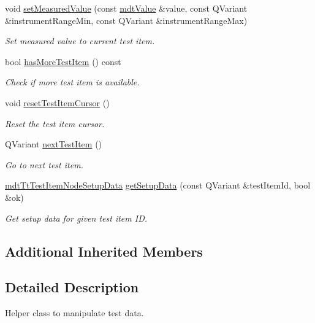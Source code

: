 \begin{DoxyCompactItemize}
void \hyperlink{classmdt_tt_test_a2e33bf83a20e02ed22aa8edd2a1d3f02}{set\-Measured\-Value} (const \hyperlink{classmdt_value}{mdt\-Value} \&value, const Q\-Variant \&instrument\-Range\-Min, const Q\-Variant \&instrument\-Range\-Max)
\begin{DoxyCompactList}\small\item\em Set measured value to current test item. \end{DoxyCompactList}\item 
bool \hyperlink{classmdt_tt_test_a3c130673f9291a7753e691c051c12c2b}{has\-More\-Test\-Item} () const 
\begin{DoxyCompactList}\small\item\em Check if more test item is available. \end{DoxyCompactList}\item 
void \hyperlink{classmdt_tt_test_ae8cafeb9cebf1c11ca136a94ba75020c}{reset\-Test\-Item\-Cursor} ()
\begin{DoxyCompactList}\small\item\em Reset the test item cursor. \end{DoxyCompactList}\item 
Q\-Variant \hyperlink{classmdt_tt_test_aeec72867e84e374f1366e7a9e0c399a8}{next\-Test\-Item} ()
\begin{DoxyCompactList}\small\item\em Go to next test item. \end{DoxyCompactList}\item 
\hyperlink{classmdt_tt_test_item_node_setup_data}{mdt\-Tt\-Test\-Item\-Node\-Setup\-Data} \hyperlink{classmdt_tt_test_adc22aa88e121f46692b41fbde5a61dc1}{get\-Setup\-Data} (const Q\-Variant \&test\-Item\-Id, bool \&ok)
\begin{DoxyCompactList}\small\item\em Get setup data for given test item I\-D. \end{DoxyCompactList}\end{DoxyCompactItemize}
\subsection*{Additional Inherited Members}


\subsection{Detailed Description}
Helper class to manipulate test data. 



